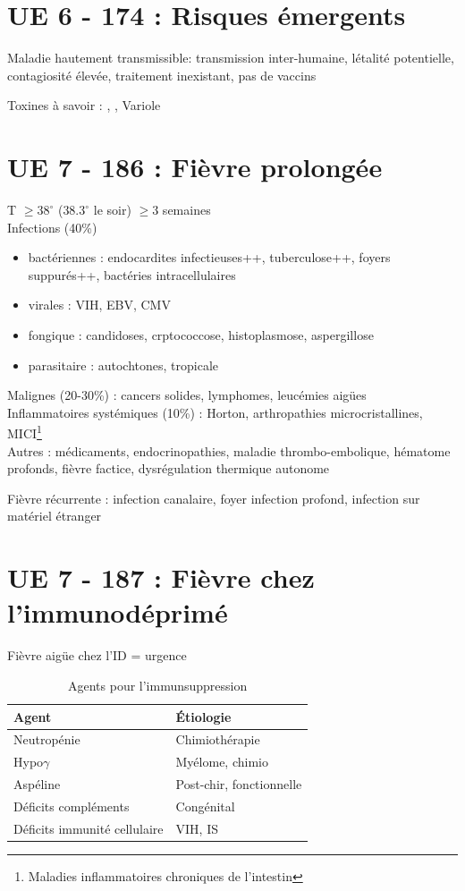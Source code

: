 \documentclass{article}
\begin{document}
\section{UE 6 - 174 : Risques émergents}%
\label{sec:item_174_risques_emergents}

Maladie hautement transmissible: transmission inter-humaine, létalité
potentielle, contagiosité élevée, traitement inexistant, pas de vaccins

Toxines à savoir : , , Variole

\section{UE 7 - 186 : Fièvre prolongée}
\label{sec:org0f8d15e}
T \(\ge 38^{\circ}\) (\(38.3^{\circ}\) le soir) \(\ge 3\) semaines\\
Infections (40\%)
\begin{itemize}
\item bactériennes : endocardites infectieuses++, tuberculose++, foyers suppurés++, bactéries intracellulaires
\item virales : VIH, EBV, CMV
\item fongique : candidoses, crptococcose, histoplasmose, aspergillose
\item parasitaire : autochtones, tropicale
\end{itemize}
Malignes (20-30\%) : cancers solides, lymphomes, leucémies aigües\\
Inflammatoires systémiques (10\%) : Horton, arthropathies microcristallines,
MICI\footnote{Maladies inflammatoires chroniques de l'intestin}\\
Autres : médicaments, endocrinopathies, maladie thrombo-embolique, hématome profonds, fièvre factice, dysrégulation thermique autonome

Fièvre récurrente : infection canalaire, foyer infection profond, infection sur matériel étranger

\section{UE 7 - 187 : Fièvre chez l'immunodéprimé}
\label{sec:org3e1654b}
Fièvre aigüe chez l'ID = urgence \skull

\begin{table}[htbp]
\caption{Agents pour l'immunsuppression}
\centering
\begin{tabular}{ll}
Agent & Étiologie\\
\hline
Neutropénie & Chimiothérapie\\
Hypo\(\gamma\) & Myélome, chimio\\
Aspéline & Post-chir, fonctionnelle\\
Déficits compléments & Congénital\\
Déficits immunité cellulaire & VIH, IS\\
\end{tabular}
\end{table}
\end{document}
